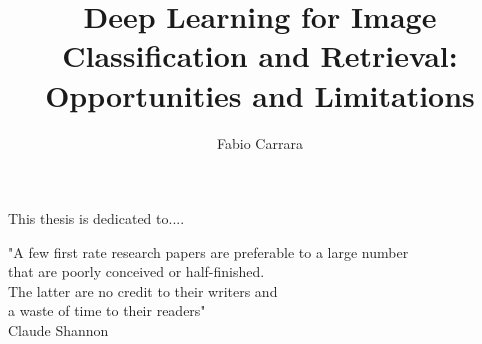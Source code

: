 \documentclass[a4,10pt,twoside,openright,italian,english]{book}%
\author{Fabio Carrara}
\title{Deep Learning for Image Classification and Retrieval: Opportunities and Limitations}
\begin{document}

\maketitle

\pagestyle{empty}

\cleardoublepage
\newpage

\thispagestyle{empty}
    \null{}
        \begin{flushright}
                This thesis is dedicated to....
        \end{flushright}
\null

\cleardoublepage
\newpage

\pagestyle{empty}

\thispagestyle{empty}
    \null{}
        \begin{flushright}
                "A few first rate research papers are preferable to a large number \\
                that are poorly conceived or half-finished.\\
                The latter are no credit to their writers and \\
                a waste of time to their readers"\\
                Claude Shannon
        \end{flushright}
\null

\cleardoublepage
\newpage

\pagestyle{empty}
\setcounter{page}{1}


\end{document}

